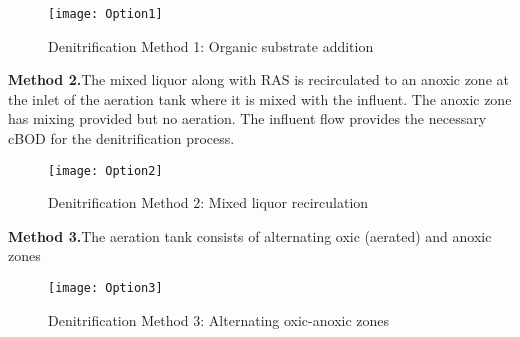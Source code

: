 	\begin{figure}[h]			
				\begin{center}
					\texttt{[image: Option1]}
					\caption{Denitrification Method 1: Organic substrate addition}
				\end{center}
	\end{figure}

\noindent \textbf{Method 2.}The mixed liquor along with RAS is recirculated to an anoxic zone at the inlet of the aeration tank where it is mixed with the influent.  The anoxic zone has mixing provided but no aeration.  The influent flow provides the necessary cBOD for the denitrification process.\\

			\begin{figure}[h]	
				\begin{center}
					\texttt{[image: Option2]}
					\caption{Denitrification Method 2: Mixed liquor recirculation}
				\end{center}
					\end{figure}
					\newpage
\noindent \textbf{Method 3.}The aeration tank consists of alternating oxic (aerated) and anoxic zones
				
			\begin{figure}[h]		
				\begin{center}
					\texttt{[image: Option3]}
			\caption{Denitrification Method 3: Alternating oxic-anoxic zones}
				\end{center}
				\end{figure}


